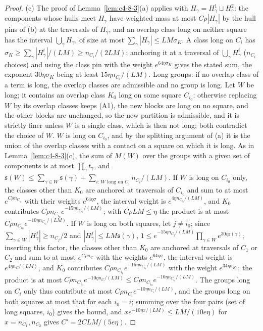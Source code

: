 \begin{proof}
(c) The proof of Lemma~\ref{lem:c4-8-3}(a) applies with $H_\gamma=H^1_\gamma\sqcup H^2_\gamma$: the components whose hulls meet $H_\gamma$ have weighted mass at most $C\rho|H_\gamma|$ by the hull pins of (b) at the traversals of $H_\gamma$, and an overlap class long on neither square has the interval $\bigcup_\gamma H_\gamma$, of size at most $\sum_\gamma|H_\gamma|\leq LM\sigma_K$. A class long on $C_i$ has $\sigma_K\geq\sum_\gamma|H^i_\gamma|/(LM)\geq n_{C_i}/(2LM)$; anchoring it at a traversal of $\bigcup_\gamma H^i_\gamma$ ($n_{C_i}$ choices) and using the class pin with the weight $e^{64\eta\sigma_K}$ gives the stated sum, the exponent $30\eta\sigma_K$ being at least $15\eta n_{C_i}/(LM)$. Long groups: if no overlap class of a term is long, the overlap classes are admissible and no group is long. Let $W$ be long; it contains an overlap class $K_0$ long on some square $C_{i_0}$: otherwise replacing $W$ by its overlap classes keeps (A1), the new blocks are long on no square, and the other blocks are unchanged, so the new partition is admissible, and it is strictly finer unless $W$ is a single class, which is then not long; both contradict the choice of $W$. $W$ is long on $C_{i_0}$, and by the splitting argument of (a) it is the union of the overlap classes with a contact on a square on which it is long. As in Lemma~\ref{lem:c4-8-3}(c), the sum of $M(W)$ over the groups with a given set of components is at most $\prod_\gamma t_\gamma$, and $\mathfrak s(W)\leq\sum_{\gamma\in W}\mathfrak s(\gamma)+\sum_{i:\,W\text{ long on }C_i}n_{C_i}/(LM)$. If $W$ is long on $C_{i_0}$ only, the classes other than $K_0$ are anchored at traversals of $C_{i_0}$ and sum to at most $e^{C\rho n_{C_{i_0}}}$ with their weights $e^{64\eta\sigma}$, the interval weight is $e^{4\eta n_{C_{i_0}}/(LM)}$, and $K_0$ contributes $C\rho n_{C_{i_0}}e^{-15\eta n_{C_{i_0}}/(LM)}$; with $C\rho LM\leq\eta$ the product is at most $C\rho n_{C_{i_0}}e^{-10\eta n_{C_{i_0}}/(LM)}$. If $W$ is long on both squares, let $j\neq i_0$; since $\sum_{\gamma\in W}|H^j_\gamma|\geq n_{C_j}/2$ and $|H^j_\gamma|\leq LM\mathfrak s(\gamma)$, $1\leq e^{-15\eta n_{C_j}/(LM)}\prod_{\gamma\in W}e^{30\eta\mathfrak s(\gamma)}$; inserting this factor, the classes other than $K_0$ are anchored at traversals of $C_1$ or $C_2$ and sum to at most $e^{C\rho n_C}$ with the weights $e^{64\eta\sigma}$, the interval weight is $e^{4\eta n_C/(LM)}$, and $K_0$ contributes $C\rho n_{C_{i_0}}e^{-15\eta n_{C_{i_0}}/(LM)}$ with the weight $e^{34\eta\sigma_{K_0}}$; the product is at most $C\rho n_{C_{i_0}}e^{-10\eta n_C/(LM)}\leq C\rho n_{C_{i_0}}e^{-10\eta n_{C_{i_0}}/(LM)}$. The groups long on $C_i$ only thus contribute at most $C\rho n_{C_i}e^{-10\eta n_{C_i}/(LM)}$, and the groups long on both squares at most that for each $i_0=i$; summing over the four pairs (set of long squares, $i_0$) gives the bound, and $xe^{-10\eta x/(LM)}\leq LM/(10e\eta)$ for $x=n_{C_1},n_{C_2}$ gives $C'=2CLM/(5e\eta)$.


\end{proof}
